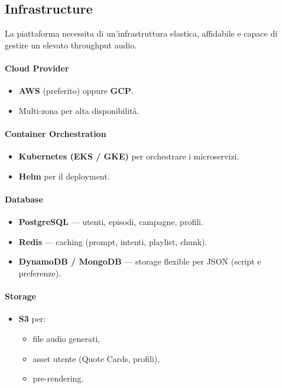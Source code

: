 \documentclass[11pt,a4paper]{article}
\begin{document}

\subsection{Infrastructure}

La piattaforma necessita di un’infrastruttura elastica, affidabile e capace di gestire un elevato throughput audio.

\paragraph{Cloud Provider}
\begin{itemize}
    \item \textbf{AWS} (preferito) oppure \textbf{GCP}.
    \item Multi-zona per alta disponibilità.
\end{itemize}

\paragraph{Container Orchestration}
\begin{itemize}
    \item \textbf{Kubernetes (EKS / GKE)} per orchestrare i microservizi.
    \item \textbf{Helm} per il deployment.
\end{itemize}

\paragraph{Database}
\begin{itemize}
    \item \textbf{PostgreSQL} — utenti, episodi, campagne, profili.
    \item \textbf{Redis} — caching (prompt, intenti, playlist, chunk).
    \item \textbf{DynamoDB / MongoDB} — storage flexible per JSON (script e preferenze).
\end{itemize}

\paragraph{Storage}
\begin{itemize}
    \item \textbf{S3} per:
    \begin{itemize}
        \item file audio generati,
        \item asset utente (Quote Cards, profili),
        \item pre-rendering.
    \end{itemize}
\end{itemize}
\end{document}
